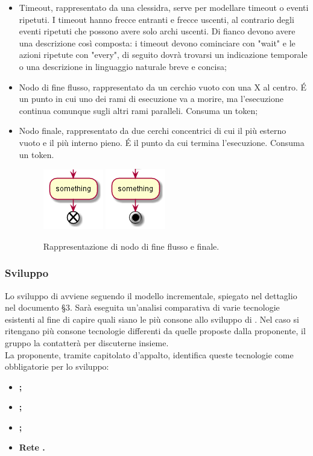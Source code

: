 \documentclass[NormeDiProgetto.tex]{subfiles}
\begin{document}
\begin{itemize}
\item Timeout, rappresentato da una clessidra, serve per modellare timeout o eventi ripetuti. I timeout hanno frecce entranti e frecce uscenti, al contrario degli eventi ripetuti che possono avere solo archi uscenti. Di fianco devono avere una descrizione così composta: i timeout devono cominciare con "wait" e le azioni ripetute con "every", di seguito dovrà trovarsi un indicazione temporale o una descrizione in linguaggio naturale breve e concisa;
\item Nodo di fine flusso, rappresentato da un cerchio vuoto con una X al centro. \'E
un punto in cui uno dei rami di esecuzione va a morire, ma l'esecuzione continua comunque sugli altri rami paralleli. Consuma un token;
\item Nodo finale, rappresentato da due cerchi concentrici di cui il più esterno vuoto e il più interno pieno. \'E il punto da cui termina l'esecuzione. Consuma un token.
\begin{figure}[H]
	\centering
	\includegraphics[width=0.2\linewidth]{progettazione/endact}
	\quad
	\includegraphics[width=0.2\linewidth]{progettazione/stopact}
	\label{fig:endact}
	\caption{Rappresentazione di nodo di fine flusso e finale.}
\end{figure}


\end{itemize}

\subsubsection{Sviluppo}
Lo sviluppo di \progetto avviene seguendo il modello incrementale, spiegato nel dettaglio nel documento \pdp \S 3. Sarà eseguita un'analisi comparativa di varie tecnologie esistenti al fine di capire quali siano le più consone allo sviluppo di \progetto. Nel caso si ritengano più consone tecnologie differenti da quelle proposte dalla proponente, il gruppo \gruppo la contatterà per discuterne insieme.\\
La proponente, tramite capitolato d'appalto, identifica queste tecnologie come obbligatorie per lo sviluppo:\\
\begin{itemize}
	\item \textbf{;}
	\item \textbf{;}
	\item \textbf{;}
	\item \textbf{Rete .}
\end{itemize}
\end{document}
